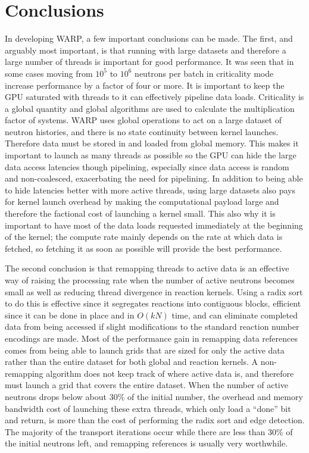\section{Conclusions}

In developing WARP, a few important conclusions can be made.  The first, and arguably most important, is that running with large datasets and therefore a large number of threads is important for good performance.  It was seen that in some cases moving from $10^5$ to $10^6$ neutrons per batch in criticality mode increase performance by a factor of four or more.  It is important to keep the GPU saturated with threads to it can effectively pipeline data loads.  Criticality is a global quantity and global algorithms are used to calculate the multiplication factor of systems.  WARP uses global operations to act on a large dataset of neutron histories, and there is no state continuity between kernel launches.  Therefore data must be stored in and loaded from global memory.  This makes it  important to launch as many threads as possible so the GPU can hide the large data access latencies though pipelining, especially since data access is random and non-coalesced, exacerbating the need for pipelining.  In addition to being able to hide latencies better with more active threads, using large datasets also pays for kernel launch overhead by making the computational payload large and therefore the factional cost of launching a kernel small.  This also why it is important to have most of the data loads requested immediately at the beginning of the kernel; the compute rate mainly depends on the rate at which data is fetched, so fetching it as soon as possible will provide the best performance.

The second conclusion is that remapping threads to active data is an effective way of raising the processing rate when the number of active neutrons becomes small as well as reducing thread divergence in reaction kernels.  Using a radix sort to do this is effective since it segregates reactions into contiguous blocks, efficient since it can be done in place and in $O(kN)$ time, and can eliminate completed data from being accessed if slight modifications to the standard reaction number encodings are made.  Most of the performance gain in remapping data references comes from being able to launch grids that are sized for only the active data rather than the entire dataset for both global and reaction kernels.  A non-remapping algorithm does not keep track of where active data is, and therefore must launch a grid that covers the entire dataset.  When the number of active neutrons drops below about 30\% of the initial number, the overhead and memory bandwidth cost of launching these extra threads, which only load a ``done'' bit and return, is more than the cost of performing the radix sort and edge detection.  The majority of the transport iterations occur  while there are less than 30\% of the initial neutrons left, and remapping references is usually very worthwhile.

